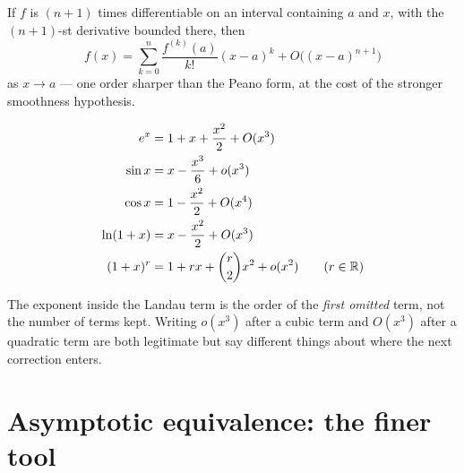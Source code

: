 \documentclass{essay}
\begin{document}
\begin{theorem}
  If \(f\) is \((n+1)\) times differentiable on an interval containing \(a\) and \(x\), with the \((n+1)\)-st derivative bounded there, then
  \[ f(x) = \sum_{k=0}^{n} \frac{f^{(k)}(a)}{k!}(x-a)^{k} + O\big((x-a)^{n+1}\big) \]
  as \(x\to a\) --- one order sharper than the Peano form, at the cost of the stronger smoothness hypothesis.
\end{theorem}

\begin{example}
  \begin{align*}
    e^{x} &= 1 + x + \frac{x^{2}}{2} + O(x^{3}) \\
    \sin x &= x - \frac{x^{3}}{6} + o(x^{3}) \\
    \cos x &= 1 - \frac{x^{2}}{2} + O(x^{4}) \\
    \ln(1+x) &= x - \frac{x^{2}}{2} + O(x^{3}) \\
    (1+x)^{r} &= 1 + rx + \binom{r}{2}x^{2} + o(x^{2}) \qquad (r\in\mathbb{R})
  \end{align*}
\end{example}

\begin{remark}
  The exponent inside the Landau term is the order of the \emph{first omitted} term, not the number of terms kept. Writing \(o(x^{3})\) after a cubic term and \(O(x^{3})\) after a quadratic term are both legitimate but say different things about where the next correction enters.
\end{remark}

\section{Asymptotic equivalence: the finer tool}
\end{document}
